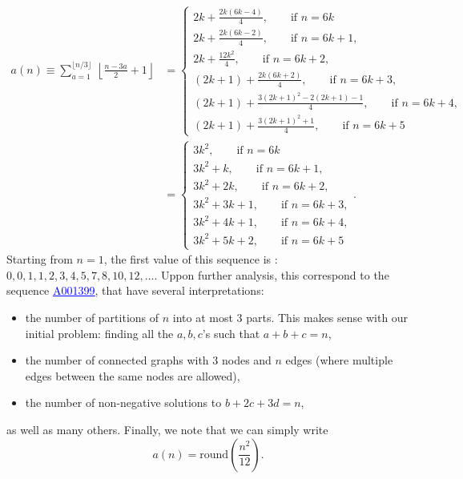         \begin{align}
            a(n)\equiv\sum^{\lfloor n/3\rfloor}_{a=1}~\left\lfloor \frac{n-3a}{2}+1\right\rfloor&=
            \begin{cases}
                2k+\frac{2k(6k-4)}{4},\qquad\text{if $n=6k$}\\
                2k+\frac{2k(6k-2)}{4},\qquad\text{if $n=6k+1$},\\
                2k+\frac{12k^2}{4},\qquad\text{if $n=6k+2$},\\
                (2k+1)+\frac{2k(6k+2)}{4},\qquad\text{if $n=6k+3$},\\
                (2k+1)+\frac{3(2k+1)^2-2(2k+1)-1}{4},\qquad\text{if $n=6k+4$},\\
                (2k+1)+\frac{3(2k+1)^2+1}{4},\qquad\text{if $n=6k+5$}
            \end{cases}\\
            &=
            \begin{cases}
                3k^2,\qquad\text{if $n=6k$}\\
                3k^2+k,\qquad\text{if $n=6k+1$},\\
                3k^2+2k,\qquad\text{if $n=6k+2$},\\
                3k^2+3k+1,\qquad\text{if $n=6k+3$},\\
                3k^2+4k+1,\qquad\text{if $n=6k+4$},\\
                3k^2+5k+2,\qquad\text{if $n=6k+5$}
            \end{cases}.
        \end{align}
        Starting from $n=1$, the first value of this sequence is : $0,0,1,1,2,3,4,5,7,8,10,12,\dots$. Uppon  further analysis, this correspond to the sequence \href{https://oeis.org/A001399}{\textcolor{blue}{\underline{A001399}}}, that have several interpretations:
        \begin{itemize}
            \item the number of partitions of $n$ into at most 3 parts. This makes sense with our initial problem: finding all the $a,b,c$'s such that $a+b+c=n$,
            \item the number of connected graphs with $3$ nodes and $n$ edges (where multiple edges between the same nodes are allowed),
            \item the number of non-negative solutions to $b+2c+3d=n$,
        \end{itemize}
        as well as many others. Finally, we note that we can simply write
        \begin{equation}
            a(n)=\text{round}\left(\frac{n^2}{12}\right).
        \end{equation}

